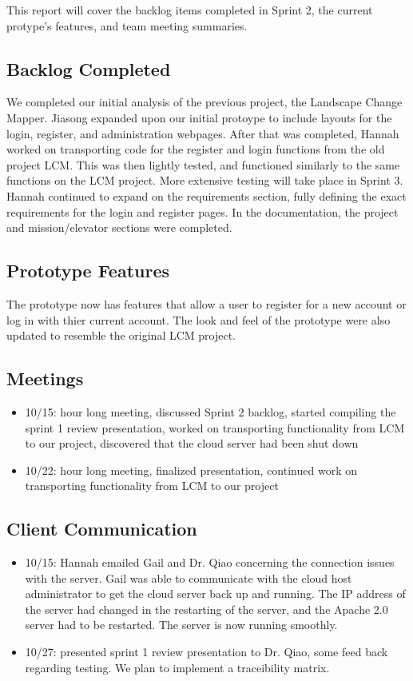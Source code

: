 
This report will cover the backlog items completed in Sprint 2, the current protype's features, and team meeting summaries. 

 \subsection{Backlog Completed}
 We completed our initial analysis of the previous project, the Landscape Change Mapper. Jiasong expanded upon our initial protoype to include layouts for the login, register, and administration webpages. After that was completed, Hannah worked on transporting code for the register and login functions from the old project LCM. This was then lightly tested, and functioned similarly to the same functions on the LCM project. More extensive testing will take place in Sprint 3. Hannah continued to expand on the requirements section, fully defining the exact requirements for the login and register pages. In the documentation, the project and mission/elevator sections were completed. 
 
 \subsection{Prototype Features}
 The prototype now has features that allow a user to register for a new account or log in with thier current account. The look and feel of the prototype were also updated to resemble the original LCM project.
 
 \subsection{Meetings}
\begin{itemize}
\item10/15: hour long meeting, discussed Sprint 2 backlog, started compiling the sprint 1 review presentation, worked on transporting functionality from LCM to our project, discovered that the cloud server had been shut down
\item10/22: hour long meeting, finalized presentation, continued work on transporting functionality from LCM to our project
\end{itemize}

\subsection{Client Communication}
\begin{itemize}
\item10/15: Hannah emailed Gail and Dr. Qiao concerning the connection issues with the server. Gail was able to communicate with the cloud host administrator to get the cloud server back up and running. The IP address of the server had changed in the restarting of the server, and the Apache 2.0 server had to be restarted. The server is now running smoothly.
\item10/27: presented sprint 1 review presentation to Dr. Qiao, some feed back regarding testing. We plan to implement a traceibility matrix.
\end{itemize}

